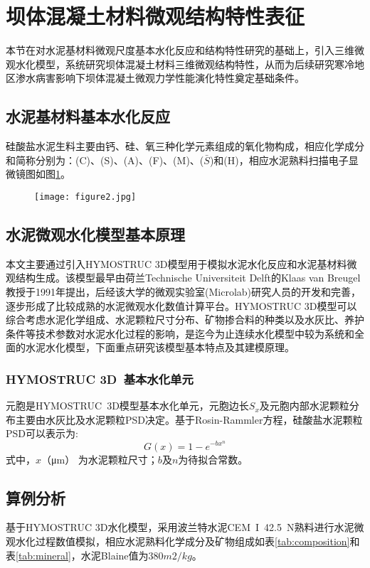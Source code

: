 \section{坝体混凝土材料微观结构特性表征}
本节在对水泥基材料微观尺度基本水化反应和结构特性研究的基础上，引入三维微观水化模型，系统研究坝体混凝土材料三维微观结构特性，从而为后续研究寒冷地区渗水病害影响下坝体混凝土微观力学性能演化特性奠定基础条件。

\subsection{水泥基材料基本水化反应}
硅酸盐水泥生料主要由钙、硅、氧三种化学元素组成的氧化物构成，相应化学成分和简称分别为：(C)、(S)、(A)、(F)、(M)、($\bar{S}$)和(H)，相应水泥熟料扫描电子显微镜图如图\ref{fig:diagram}。

\begin{figure}[H]
	\centering
	\texttt{[image: figure2.jpg]}
	\label{fig:diagram}
\end{figure}
\subsection{水泥微观水化模型基本原理}
本文主要通过引入HYMOSTRUC 3D模型用于模拟水泥水化反应和水泥基材料微观结构生成。该模型最早由荷兰Technische Universiteit Delft的Klaas van Breugel教授于1991年提出\cite{Delft1991Simulation,钱智炜2010水泥净浆微观结构断裂破坏过程的三维模拟}，后经该大学的微观实验室(Microlab)研究人员的开发和完善，逐步形成了比较成熟的水泥微观水化数值计算平台。HYMOSTRUC 3D模型可以综合考虑水泥化学组成、水泥颗粒尺寸分布、矿物掺合料的种类以及水灰比、养护条件等技术参数对水泥水化过程的影响，是迄今为止连续水化模型中较为系统和全面的水泥水化模型，下面重点研究该模型基本特点及其建模原理。
\subsubsection{HYMOSTRUC 3D~基本水化单元}
元胞是HYMOSTRUC~3D模型基本水化单元，元胞边长$S_{x}$及元胞内部水泥颗粒分布主要由水灰比及水泥颗粒PSD决定。基于Rosin-Rammler方程，硅酸盐水泥颗粒PSD可以表示为:
\begin{equation}
	G(x)=1-e^{-bx^{n}}
\end{equation}
\noindent 式中，$x$（μm） 为水泥颗粒尺寸；$b$及$n$为待拟合常数。

\subsection{算例分析}
基于HYMOSTRUC 3D水化模型，采用波兰特水泥CEM~I~42.5~N熟料进行水泥微观水化过程数值模拟，相应水泥熟料化学成分及矿物组成如表\ref{tab:composition}和表\ref{tab:mineral}，水泥Blaine值为$380m2/kg$。

